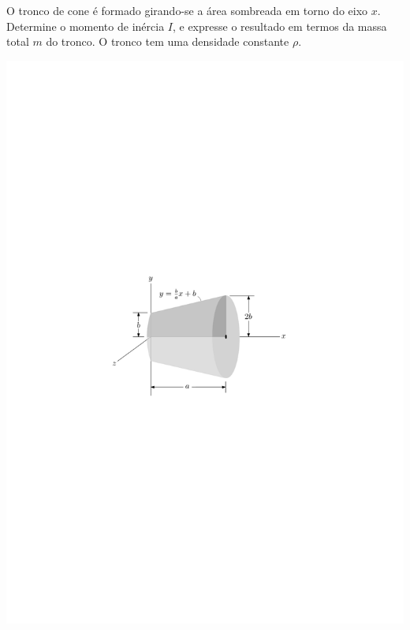 \item O tronco de cone é formado girando-se a área sombreada em torno do eixo $x$. Determine o momento de inércia $I$, e expresse o resultado em termos da massa total $m$ do tronco. O tronco tem uma densidade constante $\rho$.

\vspace{-.7cm}
\begin{flushright}
	\includegraphics[scale=1.05]{../../images/draw_1}
\end{flushright}